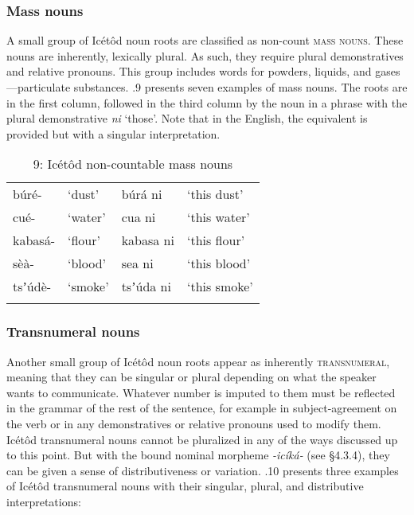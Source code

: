 \subsubsection{Mass nouns}

A small group of Icétôd noun roots are classified as non-count \textsc{mass} \textsc{nouns}. These nouns are inherently, lexically plural. As such, they require plural demonstratives and relative pronouns. This group includes words for powders, liquids, and gases—particulate substances. .9 presents seven examples of mass nouns. The roots are in the first column, followed in the third column by the noun in a phrase with the plural demonstrative \textit{ni }‘those’. Note that in the English, the equivalent is provided but with a singular interpretation.


\begin{table}
\caption{9: Icétôd non-countable mass nouns}
\label{tab:4}


\begin{tabularx}{\textwidth}{XXXX}
\lsptoprule

búré- & ‘dust’ & búrá ni & ‘this dust’\\
cué- & ‘water’ & cua ni & ‘this water’\\
kabasá- & ‘flour’ & kabasa ni & ‘this flour’\\
sèà- & ‘blood’ & sea ni & ‘this blood’\\
tsʼúdè- & ‘smoke’ & tsʼúda ni & ‘this smoke’\\
\lspbottomrule
\end{tabularx}
\end{table}

\subsubsection{Transnumeral nouns}

Another small group of Icétôd noun roots appear as inherently \textsc{transnumeral}, meaning that they can be singular or plural depending on what the speaker wants to communicate. Whatever number is imputed to them must be reflected in the grammar of the rest of the sentence, for example in subject-agreement on the verb or in any demonstratives or relative pronouns used to modify them. Icétôd transnumeral nouns cannot be pluralized in any of the ways discussed up to this point. But with the bound nominal morpheme \textit{{}-icíká-} (see §4.3.4), they can be given a sense of distributiveness or variation. .10 presents three examples of Icétôd transnumeral nouns with their singular, plural, and distributive interpretations:


